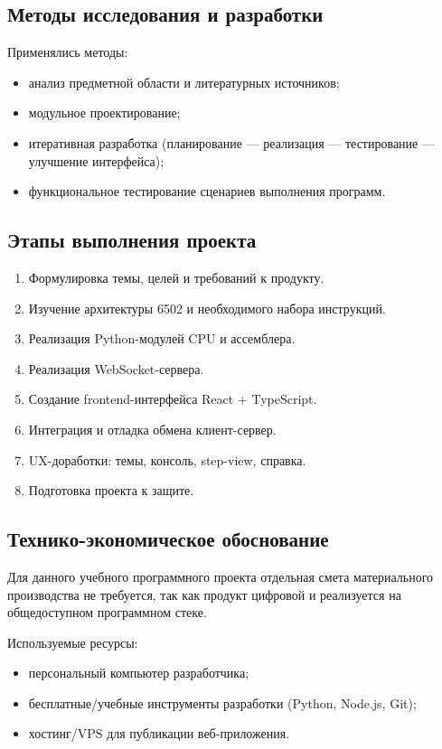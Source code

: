 \documentclass[12pt,a4paper]{article}
\begin{document}
\subsection{Методы исследования и разработки}
Применялись методы:
\begin{itemize}
  \item анализ предметной области и литературных источников;
  \item модульное проектирование;
  \item итеративная разработка (планирование --- реализация --- тестирование --- улучшение интерфейса);
  \item функциональное тестирование сценариев выполнения программ.
\end{itemize}

\subsection{Этапы выполнения проекта}
\begin{enumerate}
  \item Формулировка темы, целей и требований к продукту.
  \item Изучение архитектуры 6502 и необходимого набора инструкций.
  \item Реализация Python-модулей CPU и ассемблера.
  \item Реализация WebSocket-сервера.
  \item Создание frontend-интерфейса React + TypeScript.
  \item Интеграция и отладка обмена клиент-сервер.
  \item UX-доработки: темы, консоль, step-view, справка.
  \item Подготовка проекта к защите.
\end{enumerate}

\subsection{Технико-экономическое обоснование}
Для данного учебного программного проекта отдельная смета материального производства не требуется, так как продукт цифровой и реализуется на общедоступном программном стеке.

Используемые ресурсы:
\begin{itemize}
  \item персональный компьютер разработчика;
  \item бесплатные/учебные инструменты разработки (Python, Node.js, Git);
  \item хостинг/VPS для публикации веб-приложения.
\end{itemize}
\end{document}
